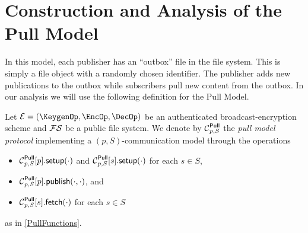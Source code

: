 \section{Construction and Analysis of the Pull Model}
\label{PullAnalysis}

In this model, each publisher has an \enquote{outbox} file in the file system.
This is simply a file object with a randomly chosen identifier.
The publisher adds new publications to the outbox while subscribers pull new 
content from the outbox.
In our analysis we will use the following definition for the Pull Model.

\begin{definition}\label{PullModel}
  Let \(\mathcal{E} = (\KeygenOp, \EncOp, \DecOp)\) be an authenticated 
  broadcast-encryption scheme and \(\FS\) be a public file system.
  We denote by \(\Pull[p, S]\) the \emph{pull model protocol} implementing 
  a \((p, S)\)-communication model through the operations
  \begin{itemize}
    \item \(\psetup[p, S]{p}[\cdot]\) and \(\psetup[p, S]{s}[\cdot]\) for each
      \(s\in S\),
    \item \(\ppub[p, S]{p}[\cdot][\cdot]\), and
    \item \(\pget[p, S]{s}[\cdot]\) for each \(s\in S\)
  \end{itemize}
  as in \cref{PullFunctions}.
\end{definition}

